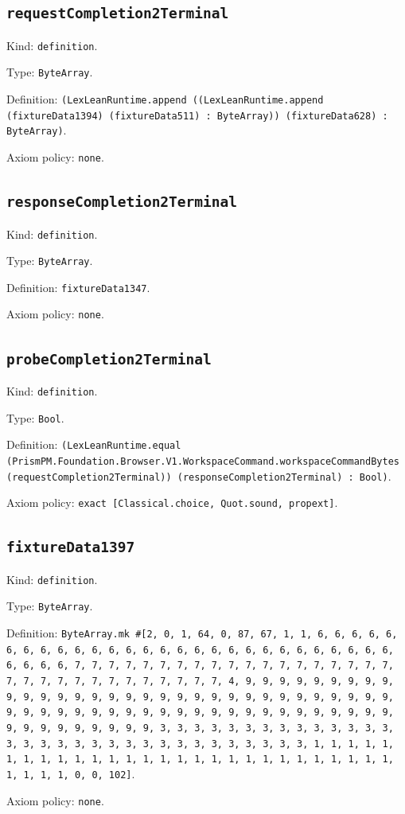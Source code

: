 \documentclass[11pt]{article}
\begin{document}
\subsection*{\texttt{requestCompletion2Terminal}}
\noindent Kind: \texttt{definition}.\par
\noindent Type: \texttt{ByteArray}.\par
\noindent Definition: \texttt{(LexLeanRuntime.append ((LexLeanRuntime.append (fixtureData1394) (fixtureData511) : ByteArray)) (fixtureData628) : ByteArray)}.\par
\noindent Axiom policy: \texttt{none}.\par
\subsection*{\texttt{responseCompletion2Terminal}}
\noindent Kind: \texttt{definition}.\par
\noindent Type: \texttt{ByteArray}.\par
\noindent Definition: \texttt{fixtureData1347}.\par
\noindent Axiom policy: \texttt{none}.\par
\subsection*{\texttt{probeCompletion2Terminal}}
\noindent Kind: \texttt{definition}.\par
\noindent Type: \texttt{Bool}.\par
\noindent Definition: \texttt{(LexLeanRuntime.equal (PrismPM.Foundation.Browser.V1.WorkspaceCommand.workspaceCommandBytes (requestCompletion2Terminal)) (responseCompletion2Terminal) : Bool)}.\par
\noindent Axiom policy: \texttt{exact [Classical.choice, Quot.sound, propext]}.\par
\subsection*{\texttt{fixtureData1397}}
\noindent Kind: \texttt{definition}.\par
\noindent Type: \texttt{ByteArray}.\par
\noindent Definition: \texttt{ByteArray.mk \#[2, 0, 1, 64, 0, 87, 67, 1, 1, 6, 6, 6, 6, 6, 6, 6, 6, 6, 6, 6, 6, 6, 6, 6, 6, 6, 6, 6, 6, 6, 6, 6, 6, 6, 6, 6, 6, 6, 6, 6, 6, 7, 7, 7, 7, 7, 7, 7, 7, 7, 7, 7, 7, 7, 7, 7, 7, 7, 7, 7, 7, 7, 7, 7, 7, 7, 7, 7, 7, 7, 7, 7, 7, 4, 9, 9, 9, 9, 9, 9, 9, 9, 9, 9, 9, 9, 9, 9, 9, 9, 9, 9, 9, 9, 9, 9, 9, 9, 9, 9, 9, 9, 9, 9, 9, 9, 9, 9, 9, 9, 9, 9, 9, 9, 9, 9, 9, 9, 9, 9, 9, 9, 9, 9, 9, 9, 9, 9, 9, 9, 9, 9, 9, 9, 9, 9, 9, 9, 3, 3, 3, 3, 3, 3, 3, 3, 3, 3, 3, 3, 3, 3, 3, 3, 3, 3, 3, 3, 3, 3, 3, 3, 3, 3, 3, 3, 3, 3, 3, 3, 1, 1, 1, 1, 1, 1, 1, 1, 1, 1, 1, 1, 1, 1, 1, 1, 1, 1, 1, 1, 1, 1, 1, 1, 1, 1, 1, 1, 1, 1, 1, 1, 0, 0, 102]}.\par
\noindent Axiom policy: \texttt{none}.\par
\end{document}

